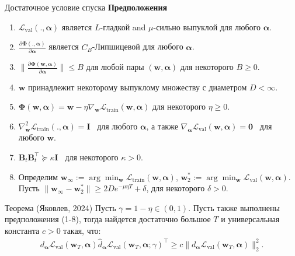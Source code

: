 \documentclass[aspectratio=169]{beamer}
\def\ltrn{\mathcal{L}_{\mathrm{train}}}
\def\lval{\mathcal{L}_{\mathrm{val}}}
\newcommand{\vect}[1]{\boldsymbol{\mathbf{#1}}}
\begin{document}
\begin{frame}{Достаточное условие спуска}
  \textbf{Предположения}
  \begin{enumerate}
    \item $\lval(., \vect{\alpha})$ является $L$-гладкой and $\mu$-сильно выпуклой для любого $\vect{\alpha}$.
   \item $\frac{\partial\vect{\Phi}(., \vect{\alpha})}{\partial\vect{\alpha}}$ является $C_B$-Липшицевой для любого $\vect{\alpha}$.
   \item $\|\frac{\partial\vect{\Phi}(\vect{w}, \vect{\alpha})}{\partial\vect{\alpha}}\| \leq B$ для любой пары $(\vect{w}, \vect{\alpha})$ для некоторого $B \geq 0$.
   \item $\vect{w}$ принадлежит некоторому выпуклому множеству с диаметром $D < \infty$.
   \item $\vect{\Phi}(\vect{w}, \vect{\alpha}) = \vect{w} - \eta\nabla_{\vect{w}}\ltrn(\vect{w}, \vect{\alpha})$ для некоторого $\eta \geq 0$.
   \item $\nabla^2_{\vect{w}}\ltrn(., \vect{\alpha}) = \vect{I}$ \, для любого $\vect{\alpha}$, а также $\nabla_{\vect{\alpha}}\lval(\vect{w}, \vect{\alpha}) = \vect{0}$ \, для любого $\vect{w}$.
   \item $\vect{B}_t\vect{B}_t^\top \succeq \kappa \vect{I}$ \, для некоторого $\kappa > 0$. 
   \item Определим $\vect{w}_{\infty} := \arg\min_{\vect{w}}\ltrn(\vect{w}, \vect{\alpha})$, $\vect{w}^*_2 := \arg\min_{\vect{w}}\lval(\vect{w}, \vect{\alpha})$. Пусть $\|\vect{w}_{\infty} - \vect{w}_2^*\| \geq 2De^{-\mu\eta T} + \delta$, для некоторого $\delta > 0$. 
\end{enumerate}

  \begin{block}{Теорема (Яковлев, 2024)}
  Пусть $\gamma = 1 - \eta \in (0, 1)$. Пусть также выполнены предположения (1-8), тогда найдется достаточно большое $T$ и универсальная константа $c > 0$ такая, что:
  \begin{align*}
      d_{\vect{\alpha}}\lval(\vect{w}_T, \vect{\alpha}) \hat{d}_{\vect{\alpha}}\lval(\vect{w}_T, \vect{\alpha}; \gamma)^\top \geq c \|d_{\vect{\alpha}}\lval(\vect{w}_T, \vect{\alpha})\|_2^2.
  \end{align*}
\end{block}
  
\end{frame}



\end{document}
